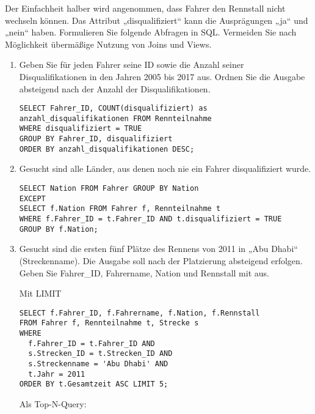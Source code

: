 \documentclass{lehramt-informatik-aufgabe}
\begin{document}
\noindent
Der Einfachheit halber wird angenommen, dass Fahrer den Rennstall nicht
wechseln können. Das Attribut „disqualifiziert“ kann die Ausprägungen
„ja“ und „nein“ haben. Formulieren Sie folgende Abfragen in SQL.
Vermeiden Sie nach Möglichkeit übermäßige Nutzung von Joins und Views.

\begin{enumerate}
\item Geben Sie für jeden Fahrer seine ID sowie die Anzahl seiner
Disqualifikationen in den Jahren 2005 bis 2017 aus. Ordnen Sie die
Ausgabe absteigend nach der Anzahl der Disqualifikationen.

\begin{liAntwort}
\begin{verbatim}
SELECT Fahrer_ID, COUNT(disqualifiziert) as anzahl_disqualifikationen FROM Rennteilnahme
WHERE disqualifiziert = TRUE
GROUP BY Fahrer_ID, disqualifiziert
ORDER BY anzahl_disqualifikationen DESC;
\end{verbatim}
\end{liAntwort}

\item Gesucht sind alle Länder, aus denen noch nie ein Fahrer
disqualifiziert wurde.

\begin{liAntwort}
\begin{verbatim}
SELECT Nation FROM Fahrer GROUP BY Nation
EXCEPT
SELECT f.Nation FROM Fahrer f, Rennteilnahme t
WHERE f.Fahrer_ID = t.Fahrer_ID AND t.disqualifiziert = TRUE
GROUP BY f.Nation;
\end{verbatim}
\end{liAntwort}

\item Gesucht sind die ersten fünf Plätze des Rennens von 2011 in „Abu
Dhabi“ (Streckenname). Die Ausgabe soll nach der Platzierung absteigend
erfolgen. Geben Sie Fahrer\_ID, Fahrername, Nation und Rennstall mit
aus.

\begin{liAntwort}
Mit LIMIT
\begin{verbatim}
SELECT f.Fahrer_ID, f.Fahrername, f.Nation, f.Rennstall
FROM Fahrer f, Rennteilnahme t, Strecke s
WHERE
  f.Fahrer_ID = t.Fahrer_ID AND
  s.Strecken_ID = t.Strecken_ID AND
  s.Streckenname = 'Abu Dhabi' AND
  t.Jahr = 2011
ORDER BY t.Gesamtzeit ASC LIMIT 5;
\end{verbatim}

Als Top-N-Query:


\end{liAntwort}
\end{enumerate}
\end{document}
